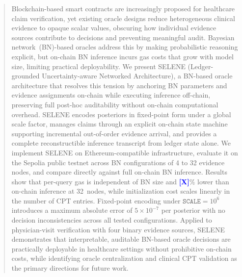 \documentclass[journal]{IEEEtran}
\newcommand{\placeholder}[1]{\textcolor{blue}{\textbf{[#1]}}}
\begin{document}
\begin{abstract}
Blockchain-based smart contracts are increasingly proposed
for healthcare claim verification, yet existing oracle designs
reduce heterogeneous clinical evidence to opaque scalar values,
obscuring how individual evidence sources contribute to
decisions and preventing meaningful audit.
Bayesian network~(BN)-based oracles address this by making
probabilistic reasoning explicit, but on-chain BN inference
incurs gas costs that grow with model size, limiting practical
deployability.
We present SELENE (Ledger-grounded Uncertainty-aware Networked
Architecture), a BN-based oracle architecture that resolves
this tension by anchoring BN parameters and evidence
assignments on-chain while executing inference off-chain,
preserving full post-hoc auditability without on-chain
computational overhead.
SELENE encodes posteriors in fixed-point form under a global
scale factor, manages claims through an explicit on-chain
state machine supporting incremental out-of-order evidence
arrival, and provides a complete reconstructible inference
transcript from ledger state alone.
We implement SELENE on Ethereum-compatible infrastructure,
evaluate it on the Sepolia public testnet across BN
configurations of 4 to 32 evidence nodes, and compare
directly against full on-chain BN inference.
Results show that per-query gas is independent of BN size
and \placeholder{X}\% lower than on-chain inference at
32~nodes, while initialization cost scales linearly in the
number of CPT entries.
Fixed-point encoding under $\texttt{SCALE}=10^6$ introduces
a maximum absolute error of $5{\times}10^{-7}$ per posterior
with no decision inconsistencies across all tested
configurations.
Applied to physician-visit verification with four binary
evidence sources, SELENE demonstrates that interpretable,
auditable BN-based oracle decisions are practically
deployable in healthcare settings without prohibitive
on-chain costs, while identifying oracle centralization
and clinical CPT validation as the primary directions for
future work.
\end{abstract}
\end{document}
